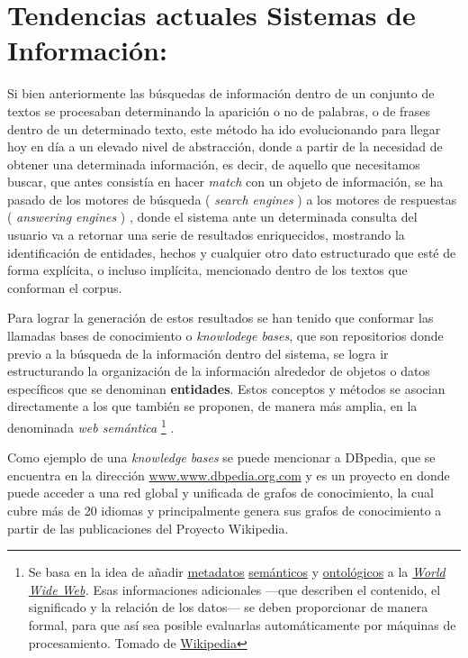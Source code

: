 \documentclass[
  10,
  openany]{book}
\begin{document}
\hypertarget{tendencias-actuales-sistemas-de-informaciuxf3n}{%
\section{Tendencias actuales Sistemas de Información:}\label{tendencias-actuales-sistemas-de-informaciuxf3n}}

Si bien anteriormente las búsquedas de información dentro de un conjunto de textos se procesaban determinando la aparición o no de palabras, o de frases dentro de un determinado texto, este método ha ido evolucionando para llegar hoy en día a un elevado nivel de abstracción, donde a partir de la necesidad de obtener una determinada información, es decir, de aquello que necesitamos buscar, que antes consistía en hacer \emph{match} con un objeto de información, se ha pasado de los motores de búsqueda ( \emph{search engines} ) a los motores de respuestas ( \emph{answering engines} ) \citep{balog2018}, donde el sistema ante un determinada consulta del usuario va a retornar una serie de resultados enriquecidos, mostrando la identificación de entidades, hechos y cualquier otro dato estructurado que esté de forma explícita, o incluso implícita, mencionado dentro de los textos que conforman el corpus.

Para lograr la generación de estos resultados se han tenido que conformar las llamadas bases de conocimiento o \emph{knowlodege bases}, que son repositorios donde previo a la búsqueda de la información dentro del sistema, se logra ir estructurando la organización de la información alrededor de objetos o datos específicos que se denominan \textbf{entidades}. Estos conceptos y métodos se asocian directamente a los que también se proponen, de manera más amplia, en la denominada \emph{web semántica} \footnote{Se basa en la idea de añadir \href{https://es.wikipedia.org/wiki/Metadato}{metadatos} \href{https://es.wikipedia.org/wiki/Sem\%C3\%A1ntica}{semánticos} y \href{https://es.wikipedia.org/wiki/Ontolog\%C3\%ADa_(Inform\%C3\%A1tica)}{ontológicos} a la \href{https://es.wikipedia.org/wiki/World_Wide_Web}{\emph{World Wide Web}}\emph{.} Esas informaciones adicionales ---que describen el contenido, el significado y la relación de los datos--- se deben proporcionar de manera formal, para que así sea posible evaluarlas automáticamente por máquinas de procesamiento. Tomado de \href{https://es.wikipedia.org/wiki/Web_sem\%C3\%A1ntica}{Wikipedia}} .

Como ejemplo de una \emph{knowledge bases} se puede mencionar a DBpedia, que se encuentra en la dirección \href{www.dbpedia.com}{www.www.dbpedia.org.com} y es un proyecto en donde puede acceder a una red global y unificada de grafos de conocimiento, la cual cubre más de 20 idiomas y principalmente genera sus grafos de conocimiento a partir de las publicaciones del Proyecto Wikipedia.
\end{document}
